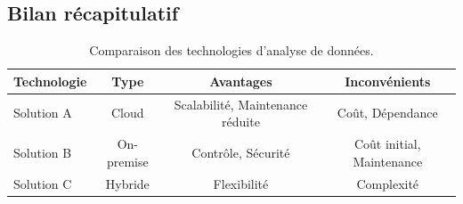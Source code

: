 \subsection{Bilan récapitulatif}
\label{sec:bilan_recap}
\begin{table}[H]
\centering
\caption{Comparaison des technologies d'analyse de données.}
\label{tab:tech_comparison}
\begin{tabular}{lccc}
\toprule
\textbf{Technologie} & \textbf{Type} & \textbf{Avantages} & \textbf{Inconvénients} \\
\midrule
Solution A & Cloud & Scalabilité, Maintenance réduite & Coût, Dépendance \\
Solution B & On-premise & Contrôle, Sécurité & Coût initial, Maintenance \\
Solution C & Hybride & Flexibilité & Complexité \\
\bottomrule
\end{tabular}
\end{table}

